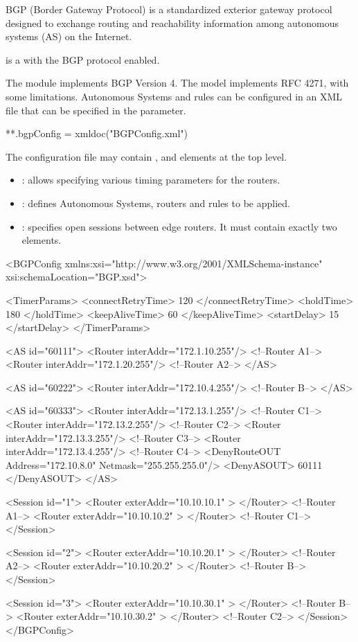 BGP (Border Gateway Protocol) is a standardized exterior gateway protocol
designed to exchange routing and reachability information among
autonomous systems (AS) on the Internet.

 is a  with the BGP protocol enabled.

The  module implements BGP Version 4. The model implements
RFC 4271, with some limitations. Autonomous Systems and rules can be
configured in an XML file that can be specified in the 
parameter.

\begin{inifile}
**.bgpConfig = xmldoc("BGPConfig.xml")
\end{inifile}

The configuration file may contain ,  and
 elements at the top level.

\begin{itemize}
  \item {}: allows specifying various timing parameters
  for the routers.
  \item {}: defines Autonomous Systems, routers and rules to be applied.
  \item {}: specifies open sessions between edge routers. It must
  contain exactly two  elements.
\end{itemize}

\begin{XML}
<BGPConfig xmlns:xsi="http://www.w3.org/2001/XMLSchema-instance"
  xsi:schemaLocation="BGP.xsd">

  <TimerParams>
    <connectRetryTime> 120 </connectRetryTime>
    <holdTime> 180 </holdTime>
    <keepAliveTime> 60 </keepAliveTime>
    <startDelay> 15 </startDelay>
  </TimerParams>

  <AS id="60111">
    <Router interAddr="172.1.10.255"/> <!--Router A1-->
    <Router interAddr="172.1.20.255"/> <!--Router A2-->
  </AS>

  <AS id="60222">
    <Router interAddr="172.10.4.255"/> <!--Router B-->
  </AS>

  <AS id="60333">
    <Router interAddr="172.13.1.255"/> <!--Router C1-->
    <Router interAddr="172.13.2.255"/> <!--Router C2-->
    <Router interAddr="172.13.3.255"/> <!--Router C3-->
    <Router interAddr="172.13.4.255"/> <!--Router C4-->
    <DenyRouteOUT Address="172.10.8.0" Netmask="255.255.255.0"/>
    <DenyASOUT> 60111 </DenyASOUT>
  </AS>

  <Session id="1">
    <Router exterAddr="10.10.10.1" > </Router> <!--Router A1-->
    <Router exterAddr="10.10.10.2" > </Router> <!--Router C1-->
  </Session>

  <Session id="2">
    <Router exterAddr="10.10.20.1" > </Router> <!--Router A2-->
    <Router exterAddr="10.10.20.2" > </Router> <!--Router B-->
  </Session>

  <Session id="3">
    <Router exterAddr="10.10.30.1" > </Router> <!--Router B-->
    <Router exterAddr="10.10.30.2" > </Router> <!--Router C2-->
  </Session>
</BGPConfig>
\end{XML}

